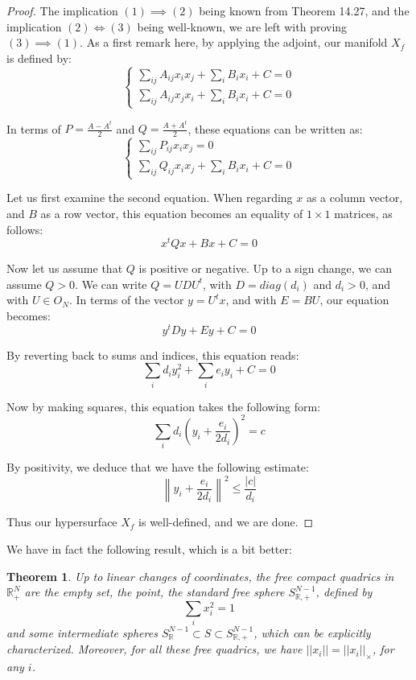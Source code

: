 \documentclass[12pt]{amsbook}
\newtheorem{theorem}{Theorem}[chapter]
\begin{document}
\begin{proof}
The implication $(1)\implies(2)$ being known from Theorem 14.27, and the implication $(2)\iff(3)$ being well-known, we are left with proving $(3)\implies(1)$.  As a first remark here, by applying the adjoint, our manifold $X_f$ is defined by:
$$\begin{cases}
\sum_{ij}A_{ij}x_ix_j+\sum_iB_ix_i+C=0\\
\sum_{ij}A_{ij}x_jx_i+\sum_iB_ix_i+C=0
\end{cases}$$

In terms of $P=\frac{A-A^t}{2}$ and $Q=\frac{A+A^t}{2}$, these equations can be written as:
$$\begin{cases}
\sum_{ij}P_{ij}x_ix_j=0\\
\sum_{ij}Q_{ij}x_ix_j+\sum_iB_ix_i+C=0
\end{cases}$$

Let us first examine the second equation. When regarding $x$ as a column vector, and $B$ as a row vector, this equation becomes an equality of $1\times1$ matrices, as follows:
$$x^tQx+Bx+C=0$$

Now let us assume that $Q$ is positive or negative. Up to a sign change, we can assume $Q>0$. We can write $Q=UDU^t$, with $D=diag(d_i)$ and $d_i>0$, and with $U\in O_N$. In terms of the vector $y=U^tx$, and with $E=BU$, our equation becomes:
$$y^tDy+Ey+C=0$$

By reverting back to sums and indices, this equation reads:
$$\sum_id_iy_i^2+\sum_ie_iy_i+C=0$$

Now by making squares, this equation takes the following form:
$$\sum_id_i\left(y_i+\frac{e_i}{2d_i}\right)^2=c$$

By positivity, we deduce that we have the following estimate:
$$\left\|y_i+\frac{e_i}{2d_i}\right\|^2\leq\frac{|c|}{d_i}$$

Thus our hypersurface $X_f$ is well-defined, and we are done. 
\end{proof}

We have in fact the following result, which is a bit better:

\begin{theorem}
Up to linear changes of coordinates, the free compact quadrics in $\mathbb R^N_+$ are the empty set, the point, the standard free sphere $S^{N-1}_{\mathbb R,+}$, defined by
$$\sum_ix_i^2=1$$
and some intermediate spheres $S^{N-1}_\mathbb R\subset S\subset S^{N-1}_{\mathbb R,+}$, which can be explicitly characterized. Moreover, for all these free quadrics, we have $||x_i||=||x_i||_\times$, for any $i$.
\end{theorem}
\end{document}
